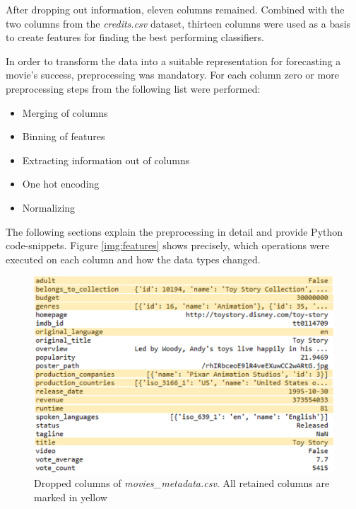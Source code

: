 After dropping out information, eleven columns remained. Combined with the two columns from the \textit{credits.csv} dataset, thirteen columns were used as a basis to create features for finding the best performing classifiers.

In order to transform the data into a suitable representation for forecasting a movie's success, preprocessing was mandatory. For each column zero or more preprocessing steps from the following list were performed:
\begin{itemize}
	\item Merging of columns
	\item Binning of features
	\item Extracting information out of columns
	\item One hot encoding
	\item Normalizing
\end{itemize}
The following sections explain the preprocessing in detail and provide Python code-snippets. Figure \ref{img:features} shows precisely, which operations were executed on each column and how the data types changed.

\begin{figure}
	\includegraphics[width=\textwidth]{images/3_metadata_columns.png}
	\caption{Dropped columns of \textit{movies\_metadata.csv}. All retained columns are marked in yellow}
	\label{img:mm_columns}
\end{figure}

